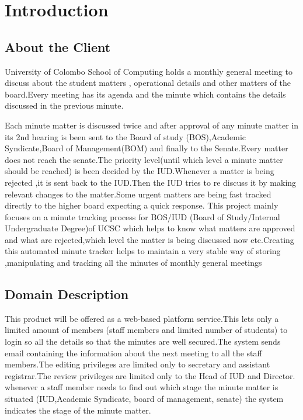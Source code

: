 \documentclass[a4paper,beamer]{article}
\begin{document}
	\renewcommand{\footrulewidth}{0.1pt}
	
	\tableofcontents
	\newpage
	
	\section{Introduction}
	
	\subsection{About the Client}
	
	University of Colombo School of Computing holds a monthly general meeting to  discuss about the student matters , operational details and other matters of the board.Every meeting has its agenda and the minute which contains the details discussed in the previous minute.\newline
	
	Each minute matter is discussed twice and after  approval of any minute matter in its 2nd hearing  is been sent to the  Board of study (BOS),Academic Syndicate,Board of Management(BOM) and finally to the Senate.Every matter does not reach the senate.The priority level(until which level a minute matter should be reached) is been decided by the IUD.Whenever a matter is being rejected ,it is sent back to the IUD.Then the IUD tries to re discuss it  by making relevant changes to the matter.Some urgent matters are being fast tracked directly to the higher board expecting a quick response. This project  mainly focuses  on a minute tracking process for BOS/IUD (Board of Study/Internal Undergraduate Degree)of UCSC which helps to know what matters are approved and what are rejected,which level the matter is being discussed now etc.Creating this automated minute tracker  helps to maintain a very stable way of storing ,manipulating and tracking  all the minutes of monthly general meetings
	
	\subsection{Domain Description}
	This product will be offered as a web-based platform service.This  lets only a limited amount of members (staff members and limited number of students) to login so all the details  so that the minutes are well secured.The system sends email containing the information about the next meeting to all the staff members.The editing privileges are limited only to secretary and assistant registrar.The review privileges are limited only  to the Head of IUD and Director. whenever a staff member needs to find out which stage the minute matter is situated (IUD,Academic Syndicate, board of management, senate) the system indicates the stage of the minute matter.\newline
	
\end{document}
